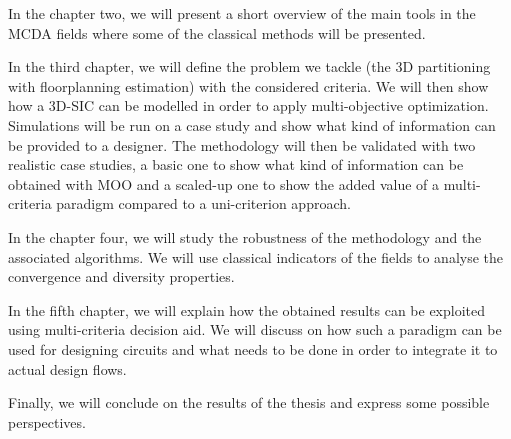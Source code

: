 In the chapter two, we will present a short overview of the main tools in the MCDA fields where some of the classical methods will be presented.

In the third chapter, we will define the problem we tackle (the 3D partitioning with floorplanning estimation) with the considered criteria. We will then show how a 3D-SIC can be modelled in order to apply multi-objective optimization. Simulations will be run on a case study and show what kind of information can be provided to a designer. The methodology will then be validated with two realistic case studies, a basic one to show what kind of information can be obtained with MOO and a scaled-up one to show the added value of a multi-criteria paradigm compared to a uni-criterion approach.

In the chapter four, we will study the robustness of the methodology and the associated algorithms. We will use classical indicators of the fields to analyse the convergence and diversity properties.

In the fifth chapter, we will explain how the obtained results can be exploited using multi-criteria decision aid. We will discuss on how such a paradigm can be used for designing circuits and what needs to be done in order to integrate it to actual design flows.

Finally, we will conclude on the results of the thesis and express some possible perspectives.

